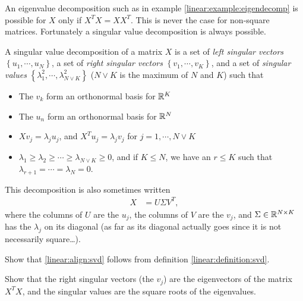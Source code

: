An eigenvalue decomposition such as in example \ref{linear:example:eigendecomp} is possible for $X$ only if $X^TX=XX^T$.  This is never the case for non-square matrices.  Fortunately a singular value decomposition is always possible.

\begin{definition}
  \label{linear:definition:svd}
A singular value decomposition of a matrix $X$ is a set of \emph{left singular vectors} $\left\{ u_1,\cdots,u_N \right\}$, a set of \emph{right singular vectors} $\left\{ v_1,\cdots,v_K \right\}$, and a set of \emph{singular values} $\left\{ \lambda^2_1,\cdots,\lambda^2_{N\vee K} \right\}$ ($N\vee K$ is the maximum of $N$ and $K$) such that
\begin{itemize}
  \item The $v_k$ form an orthonormal basis for ${\mathbb R}^K$
  \item The $u_n$ form an orthonormal basis for ${\mathbb R}^N$
  \item $Xv_j = \lambda_ju_j$, and $X^Tu_j=\lambda_jv_j$ for $j=1,\cdots,N\vee K$
  \item $\lambda_1\geq\lambda_2\geq\cdots\geq\lambda_{N\vee K}\geq0$, and if $K\leq N$, we have an $r\leq K$ such that $\lambda_{r+1}=\cdots=\lambda_N=0$.
\end{itemize}
\end{definition}
This decomposition is also sometimes written 
\begin{align}
  X &= U\Sigma V^T,
  \label{linear:align:svd}
\end{align}
where the columns of $U$ are the $u_j$, the columns of $V$ are the $v_j$, and $\Sigma\in{\mathbb R}^{N\times K}$ has the $\lambda_j$ on its diagonal (as far as its diagonal actually goes since it is not necessarily square\ldots). 

\begin{exercise}
  Show that \eqref{linear:align:svd} follows from definition \ref{linear:definition:svd}.
\end{exercise}

\begin{exercise}
  Show that the right singular vectors (the $v_j$) are the eigenvectors of the matrix $X^TX$, and the singular values are the square roots of the eigenvalues.
  \label{linear:exercise:svd-eigen}
\end{exercise}

